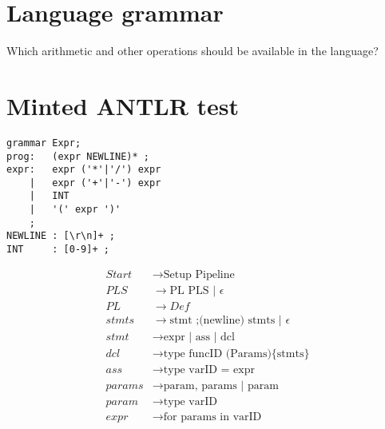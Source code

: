 \section{Language grammar}
Which arithmetic and other operations should be available in the language?

\section{Minted ANTLR test}

\begin{verbatim}
grammar Expr;		
prog:	(expr NEWLINE)* ;
expr:	expr ('*'|'/') expr
    |	expr ('+'|'-') expr
    |	INT
    |	'(' expr ')'
    ;
NEWLINE : [\r\n]+ ;
INT     : [0-9]+ ;
\end{verbatim}

\begin{align*}
    Start   & \rightarrow \text{Setup Pipeline}                     \\
    PLS     & \rightarrow \text{PL PLS | $\epsilon$}                \\
    PL      & \rightarrow Def                                       \\
    stmts   & \rightarrow \text{stmt ;(newline) stmts | $\epsilon$} \\
    stmt    & \rightarrow \text{expr | ass | dcl}                   \\
    dcl     & \rightarrow \text{type funcID (Params)\{stmts\}}      \\
    ass     & \rightarrow \text{type varID = expr}                  \\
    params  & \rightarrow \text{param, params | param}              \\
    param   & \rightarrow \text{type varID}                         \\
    expr    & \rightarrow \text{for params in varID}
\end{align*}


